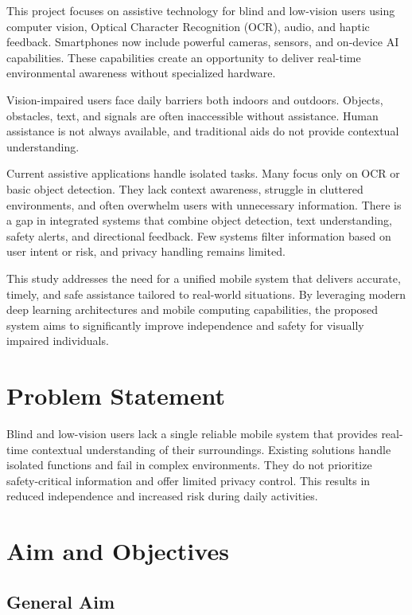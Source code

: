 \documentclass[a4paper]{report}
\begin{document}
This project focuses on assistive technology for blind and low-vision users using computer vision, Optical Character Recognition (OCR), audio, and haptic feedback. Smartphones now include powerful cameras, sensors, and on-device AI capabilities. These capabilities create an opportunity to deliver real-time environmental awareness without specialized hardware.

Vision-impaired users face daily barriers both indoors and outdoors. Objects, obstacles, text, and signals are often inaccessible without assistance. Human assistance is not always available, and traditional aids do not provide contextual understanding.

Current assistive applications handle isolated tasks. Many focus only on OCR or basic object detection. They lack context awareness, struggle in cluttered environments, and often overwhelm users with unnecessary information. There is a gap in integrated systems that combine object detection, text understanding, safety alerts, and directional feedback. Few systems filter information based on user intent or risk, and privacy handling remains limited.

This study addresses the need for a unified mobile system that delivers accurate, timely, and safe assistance tailored to real-world situations. By leveraging modern deep learning architectures and mobile computing capabilities, the proposed system aims to significantly improve independence and safety for visually impaired individuals.

\section{Problem Statement}
\label{sec:problem}

Blind and low-vision users lack a single reliable mobile system that provides real-time contextual understanding of their surroundings. Existing solutions handle isolated functions and fail in complex environments. They do not prioritize safety-critical information and offer limited privacy control. This results in reduced independence and increased risk during daily activities.

\section{Aim and Objectives}
\label{sec:objectives}

\subsection{General Aim}
\end{document}
